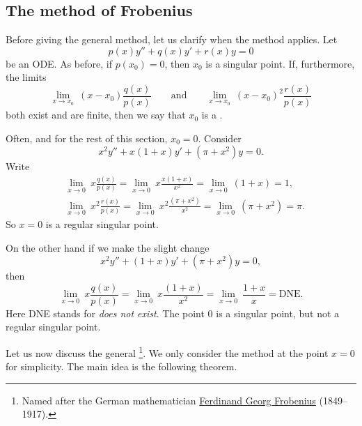 \subsection{The method of Frobenius}

Before giving the general method, let us clarify when the method applies.
Let
\begin{equation*}
p(x) y'' + q(x) y' + r(x) y = 0
\end{equation*}
be an ODE\@.  As before, if $p(x_0) = 0$, then $x_0$ is a
singular point.  If, furthermore, the limits
\begin{equation*}
\lim_{x \to x_0} ~ (x-x_0) \frac{q(x)}{p(x)}
\qquad \text{and} \qquad
\lim_{x \to x_0} ~ (x-x_0)^2 \frac{r(x)}{p(x)}
\end{equation*}
both exist and are finite, then we say that $x_0$ is
a \emph{}.

\begin{example}
Often, and for the rest of this section, $x_0 = 0$.  Consider
\begin{equation*}
x^2y'' + x(1+x)y' + (\pi+x^2)y = 0 .
\end{equation*}
Write
\begin{align*}
& \lim_{x \to 0} ~x \frac{q(x)}{p(x)} = 
\lim_{x \to 0} ~x \frac{x(1+x)}{x^2} = \lim_{x \to 0} ~(1+x) = 1 ,
\\
& \lim_{x \to 0} ~x^2 \frac{r(x)}{p(x)} = 
\lim_{x \to 0} ~x^2 \frac{(\pi+x^2)}{x^2} = \lim_{x \to 0} ~(\pi+x^2) = \pi .
\end{align*}
So $x = 0$ is a regular singular point.

On the other hand if we make the slight change
\begin{equation*}
x^2y'' + (1+x)y' + (\pi+x^2)y = 0 ,
\end{equation*}
then
\begin{equation*}
\lim_{x \to 0} ~x \frac{q(x)}{p(x)} = 
\lim_{x \to 0} ~x \frac{(1+x)}{x^2} = \lim_{x \to 0} ~\frac{1+x}{x} =
\text{DNE}.
\end{equation*}
Here DNE stands for \emph{does not exist}.
The point $0$ is a singular point, but not a regular singular point.
\end{example}

Let us now discuss the general \emph{}%
\footnote{Named after the German mathematician
\href{http://en.wikipedia.org/wiki/Ferdinand_Georg_Frobenius}{Ferdinand
Georg Frobenius} (1849--1917).}.
We only consider the method at the point $x=0$ for simplicity.  The main
idea is the following theorem.

